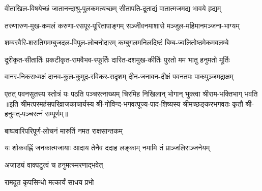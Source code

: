 
\twolineshloka
{वीताखिल-विषयेच्छं जातानन्दाश्रु-पुलकमत्यच्छम्}
{सीतापति-दूताद्यं वातात्मजमद्य भावये हृद्यम्}

\twolineshloka
{तरुणारुण-मुख-कमलं करुणा-रसपूर-पूरितापाङ्गम्}
{सञ्जीवनमाशासे मञ्जुल-महिमानमञ्जना-भाग्यम्}

\twolineshloka
{शम्बरवैरि-शरातिगमम्बुजदल-विपुल-लोचनोदारम्}
{कम्बुगलमनिलदिष्टं बिम्ब-ज्वलितोष्ठमेकमवलम्बे}

\twolineshloka
{दूरीकृत-सीतार्तिः प्रकटीकृत-रामवैभव-स्फूर्तिः}
{दारित-दशमुख-कीर्तिः पुरतो मम भातु हनुमतो मूर्तिः}

\twolineshloka
{वानर-निकराध्यक्षं दानव-कुल-कुमुद-रविकर-सदृशम्}
{दीन-जनावन-दीक्षं पवनतपः पाकपुञ्जमद्राक्षम्}

\twolineshloka
{एतत् पवनसुतस्य स्तोत्रं यः पठति पञ्चरत्नाख्यम्}
{चिरमिह निखिलान् भोगान् भुक्त्वा श्रीराम-भक्तिभाग् भवति}
॥इति श्रीमत्परमहंसपरिव्राजकाचार्यस्य श्री-गोविन्द-भगवत्पूज्य-पाद-शिष्यस्य
श्रीमच्छङ्करभगवतः कृतौ श्री-हनुमत्-पञ्चरत्नं सम्पूर्णम्॥

{बाष्पवारिपरिपूर्ण-लोचनं मारुतिं नमत राक्षसान्तकम्‌}

{यः शोकवह्निं जनकात्मजायाः}
{आदाय तेनैव ददाह लङ्काम्}
{नमामि तं प्राञ्जलिराञ्जनेयम्}

{अजाड्यं वाक्पटुत्वं च हनुमत्स्मरणाद्भवेत्}

{रामदूत कृपसिन्धो मत्कार्यं साधय प्रभो}

